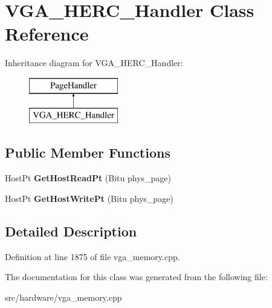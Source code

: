 \hypertarget{classVGA__HERC__Handler}{\section{V\-G\-A\-\_\-\-H\-E\-R\-C\-\_\-\-Handler Class Reference}
\label{classVGA__HERC__Handler}
}
Inheritance diagram for V\-G\-A\-\_\-\-H\-E\-R\-C\-\_\-\-Handler\-:\begin{figure}[H]
\begin{center}
\leavevmode
\includegraphics[height=2.000000cm]{classVGA__HERC__Handler}
\end{center}
\end{figure}
\subsection*{Public Member Functions}
\begin{DoxyCompactItemize}
\item 
\hypertarget{classVGA__HERC__Handler_ae520d92ecc21ac737cfc8039316e6e5c}{Host\-Pt {\bfseries Get\-Host\-Read\-Pt} (Bitu phys\-\_\-page)}\label{classVGA__HERC__Handler_ae520d92ecc21ac737cfc8039316e6e5c}

\item 
\hypertarget{classVGA__HERC__Handler_a25f8f05f6c70a3170445cf0ae346718e}{Host\-Pt {\bfseries Get\-Host\-Write\-Pt} (Bitu phys\-\_\-page)}\label{classVGA__HERC__Handler_a25f8f05f6c70a3170445cf0ae346718e}

\end{DoxyCompactItemize}


\subsection{Detailed Description}


Definition at line 1875 of file vga\-\_\-memory.\-cpp.



The documentation for this class was generated from the following file\-:\begin{DoxyCompactItemize}
\item 
src/hardware/vga\-\_\-memory.\-cpp\end{DoxyCompactItemize}
